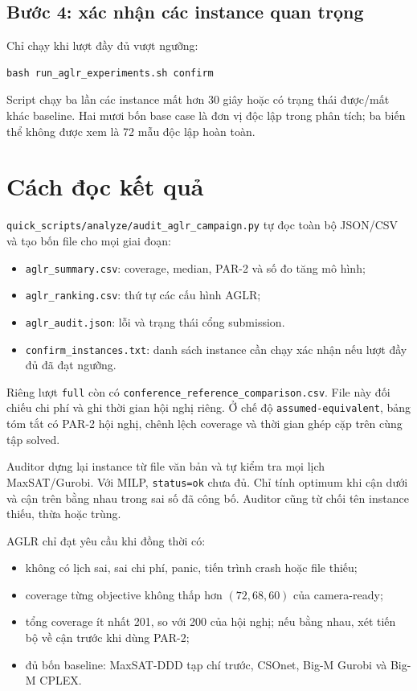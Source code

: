 \documentclass[11pt,a4paper]{article}
\newcommand{\code}[1]{\texttt{#1}}
\newcommand{\file}[1]{\nolinkurl{#1}}
\begin{document}
\subsection{Bước 4: xác nhận các instance quan trọng}

Chỉ chạy khi lượt đầy đủ vượt ngưỡng:

\begin{verbatim}
bash run_aglr_experiments.sh confirm
\end{verbatim}

Script chạy ba lần các instance mất hơn 30 giây hoặc có trạng thái được/mất khác
baseline. Hai mươi bốn base case là đơn vị độc lập trong phân tích; ba biến thể
không được xem là 72 mẫu độc lập hoàn toàn.

\section{Cách đọc kết quả}

\file{quick_scripts/analyze/audit_aglr_campaign.py} tự đọc toàn bộ JSON/CSV và
tạo bốn file cho mọi giai đoạn:

\begin{itemize}
\item \file{aglr_summary.csv}: coverage, median, PAR-2 và số đo tăng mô hình;
\item \file{aglr_ranking.csv}: thứ tự các cấu hình AGLR;
\item \file{aglr_audit.json}: lỗi và trạng thái cổng submission.
\item \file{confirm_instances.txt}: danh sách instance cần chạy xác nhận nếu
      lượt đầy đủ đã đạt ngưỡng.
\end{itemize}

Riêng lượt \code{full} còn có
\file{conference_reference_comparison.csv}. File này đối chiếu chi phí và ghi
thời gian hội nghị riêng. Ở chế độ \code{assumed-equivalent}, bảng tóm tắt có
PAR-2 hội nghị, chênh lệch coverage và thời gian ghép cặp trên cùng tập solved.

Auditor dựng lại instance từ file văn bản và tự kiểm tra mọi lịch MaxSAT/Gurobi.
Với MILP, \code{status=ok} chưa đủ. Chỉ tính optimum khi cận dưới và cận trên
bằng nhau trong sai số đã công bố. Auditor cũng từ chối tên instance thiếu,
thừa hoặc trùng.

AGLR chỉ đạt yêu cầu khi đồng thời có:

\begin{itemize}
\item không có lịch sai, sai chi phí, panic, tiến trình crash hoặc file thiếu;
\item coverage từng objective không thấp hơn $(72,68,60)$ của camera-ready;
\item tổng coverage ít nhất 201, so với 200 của hội nghị; nếu bằng nhau,
      xét tiến bộ về cận trước khi dùng PAR-2;
\item đủ bốn baseline: MaxSAT-DDD tạp chí trước, CSOnet, Big-M Gurobi và
      Big-M CPLEX.
\end{itemize}
\end{document}
